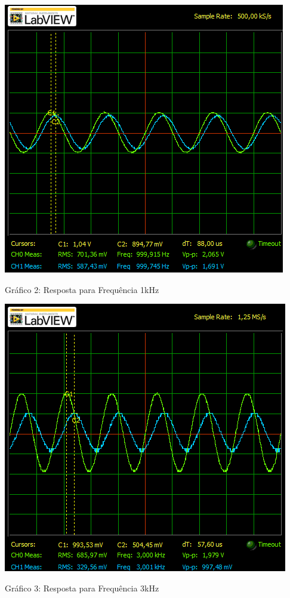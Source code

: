 \begin{table}[h]
\centering
\includegraphics[scale=0.7]{graficos/RGADICOA1}
\end{table}
\begin{center}
Gráfico 2: Resposta para Frequência 1kHz
\end{center}


\begin{table}[h]
\centering
\includegraphics[scale=0.7]{graficos/RGADICOA3}
\end{table}
\begin{center}
Gráfico 3: Resposta para Frequência 3kHz
\end{center}

